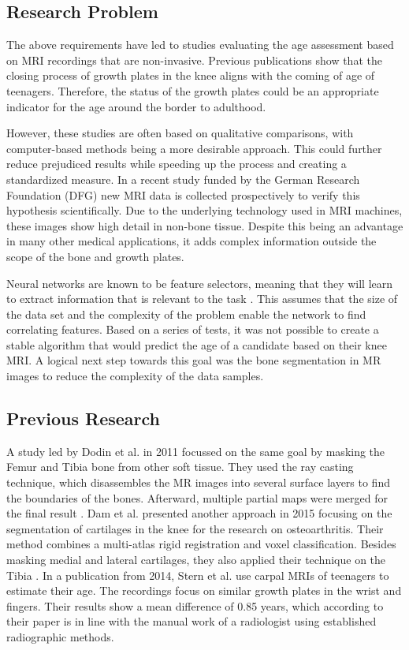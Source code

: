 \subsection{Research Problem}

The above requirements have led to studies evaluating the age assessment based on MRI recordings that are non-invasive. Previous publications \cite{Saring2014}\cite{Jopp2007} show that the closing process of growth plates in the knee aligns with the coming of age of teenagers. Therefore, the status of the growth plates could be an appropriate indicator for the age around the border to adulthood.

However, these studies are often based on qualitative comparisons, with computer-based methods being a more desirable approach. This could further reduce prejudiced results while speeding up the process and creating a standardized measure. In a recent study funded by the German Research Foundation (DFG) new MRI data is collected prospectively to verify this hypothesis scientifically. Due to the underlying technology used in MRI machines, these images show high detail in non-bone tissue. Despite this being an advantage in many other medical applications, it adds complex information outside the scope of the bone and growth plates.

Neural networks are known to be feature selectors, meaning that they will learn to extract information that is relevant to the task \cite{Setiono1997}. This assumes that the size of the data set and the complexity of the problem enable the network to find correlating features. Based on a series of tests, it was not possible to create a stable algorithm that would predict the age of a candidate based on their knee MRI. A logical next step towards this goal was the bone segmentation in MR images to reduce the complexity of the data samples.

\subsection{Previous Research}

A study led by Dodin et al. in 2011 focussed on the same goal by masking the Femur and Tibia bone from other soft tissue. They used the ray casting technique, which disassembles the MR images into several surface layers to find the boundaries of the bones. Afterward, multiple partial maps were merged for the final result \cite{Dodin2011}. Dam et al. presented another approach in 2015 focusing on the segmentation of cartilages in the knee for the research on osteoarthritis. Their method combines a multi-atlas rigid registration and voxel classification. Besides masking medial and lateral cartilages, they also applied their technique on the Tibia \cite{Dam}. In a publication from 2014, Stern et al. use carpal MRIs of teenagers to estimate their age. The recordings focus on similar growth plates in the wrist and fingers. Their results show a mean difference of 0.85 years, which according to their paper is in line with the manual work of a radiologist using established radiographic methods.

